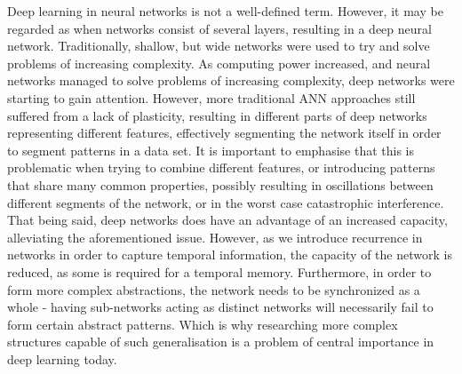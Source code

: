 
Deep learning in neural networks is not a well-defined term. However, it may be regarded as when networks consist of several layers, resulting in a deep neural network.
Traditionally, shallow, but wide networks were used to try and solve problems of increasing complexity.
As computing power increased, and neural networks managed to solve problems of increasing complexity, deep networks were starting to gain attention. However, more traditional ANN approaches still suffered from a lack of plasticity, resulting in different parts of deep networks representing different features, effectively segmenting the network itself in order to segment patterns in a data set. It is important to emphasise that this is problematic when trying to combine different features, or introducing patterns that share many common properties, possibly resulting in oscillations between different segments of the network, or in the worst case catastrophic interference.
That being said, deep networks does have an advantage of an increased capacity, alleviating the aforementioned issue. However, as we introduce recurrence in networks in order to capture temporal information, the capacity of the network is reduced, as some is required for a temporal memory. Furthermore, in order to form more complex abstractions, the network needs to be synchronized as a whole - having sub-networks acting as distinct networks will necessarily fail to form certain abstract patterns. Which is why researching more complex structures capable of such generalisation is a problem of central importance in deep learning today.




